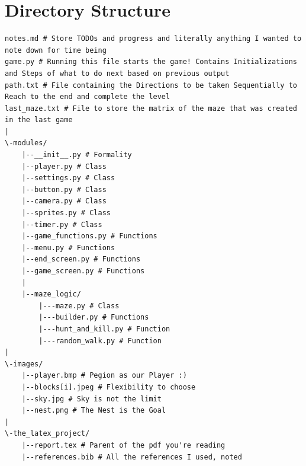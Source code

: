 \documentclass{article}
\begin{document}
\section{Directory Structure}
\begin{lstlisting}
notes.md # Store TODOs and progress and literally anything I wanted to note down for time being
game.py # Running this file starts the game! Contains Initializations and Steps of what to do next based on previous output
path.txt # File containing the Directions to be taken Sequentially to Reach to the end and complete the level
last_maze.txt # File to store the matrix of the maze that was created in the last game
|
\-modules/
    |--__init__.py # Formality
    |--player.py # Class
    |--settings.py # Class
    |--button.py # Class
    |--camera.py # Class
    |--sprites.py # Class
    |--timer.py # Class
    |--game_functions.py # Functions
    |--menu.py # Functions
    |--end_screen.py # Functions
    |--game_screen.py # Functions
    |
    |--maze_logic/
        |---maze.py # Class
        |---builder.py # Functions
        |---hunt_and_kill.py # Function
        |---random_walk.py # Function
|
\-images/
    |--player.bmp # Pegion as our Player :)
    |--blocks[i].jpeg # Flexibility to choose
    |--sky.jpg # Sky is not the limit
    |--nest.png # The Nest is the Goal
|
\-the_latex_project/
    |--report.tex # Parent of the pdf you're reading
    |--references.bib # All the references I used, noted
\end{lstlisting}
\end{document}
